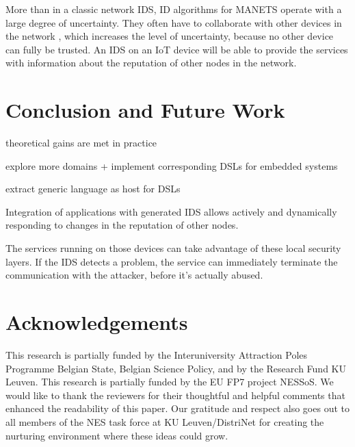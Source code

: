 \documentclass[conference]{IEEEtran}
\begin{document}
More than in a classic network IDS, ID algorithms for MANETS operate with a
large degree of uncertainty. They often have to collaborate with other devices
in the network \cite{marchang2008collaborative,krontiris2009cooperative}, which
increases the level of uncertainty, because no other device can fully be
trusted. An IDS on an IoT device will be able to provide the services with
information about the reputation \cite{ganeriwal2008reputation} of other nodes
in the network.

\section{Conclusion and Future Work}
\label{conclusion}

theoretical gains are met in practice

explore more domains + implement corresponding DSLs for embedded systems

extract generic language as host for DSLs

Integration of applications with generated IDS allows actively and dynamically
responding to changes in the reputation of other nodes.

The services running on those devices can take advantage of these local
security layers. If the IDS detects a problem, the service can immediately
terminate the communication with the attacker, before it's actually abused.

\section*{Acknowledgements}

This research is partially funded by the Interuniversity Attraction Poles
Programme Belgian State, Belgian Science Policy, and by the Research Fund KU
Leuven. This research is partially funded by the EU FP7 project NESSoS. We
would like to thank the reviewers for their thoughtful and helpful comments
that enhanced the readability of this paper. Our gratitude and respect also
goes out to all members of the NES task force at KU Leuven/DistriNet for
creating the nurturing environment where these ideas could grow.



\end{document}
